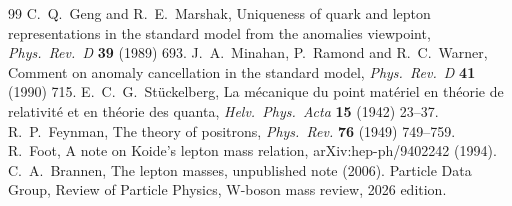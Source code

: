 \documentclass[11pt]{article}
\theoremstyle{definition}
\theoremstyle{remark}
\begin{document}
\begin{thebibliography}{99}
 C.~Q.~Geng and R.~E.~Marshak, Uniqueness of quark and lepton representations in the standard model from the anomalies viewpoint, \emph{Phys.\ Rev.\ D} \textbf{39} (1989) 693.
 J.~A.~Minahan, P.~Ramond and R.~C.~Warner, Comment on anomaly cancellation in the standard model, \emph{Phys.\ Rev.\ D} \textbf{41} (1990) 715.
 E.~C.~G.~St\"uckelberg, La m\'ecanique du point mat\'eriel en th\'eorie de relativit\'e et en th\'eorie des quanta, \emph{Helv.\ Phys.\ Acta} \textbf{15} (1942) 23--37.
 R.~P.~Feynman, The theory of positrons, \emph{Phys.\ Rev.} \textbf{76} (1949) 749--759.
 R.~Foot, A note on Koide's lepton mass relation, arXiv:hep-ph/9402242 (1994).
 C.~A.~Brannen, The lepton masses, unpublished note (2006).
 Particle Data Group, Review of Particle Physics, W-boson mass review, 2026 edition.
\end{thebibliography}
\end{document}
